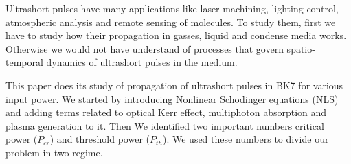 \documentclass[../main.tex]{subfiles}
\begin{document}
	Ultrashort pulses have many applications like laser machining, lighting
	control, atmospheric analysis and remote sensing of molecules. To
	study them, first we have to study how their propagation in gasses,
	liquid and condense media works. Otherwise we would not have understand
	of processes that govern spatio-temporal dynamics of ultrashort pulses
	in the medium.

	This paper does its study of propagation of ultrashort pulses in BK7 for
	various input power. We started by introducing Nonlinear Schodinger
	equations (NLS) and adding terms related to optical Kerr effect,
	multiphoton absorption and plasma generation to it.
	Then We identified two important numbers critical power
	($P_{cr}$) and threshold power ($P_{th}$). We used these numbers to
	divide our problem in two regime.
\end{document}
